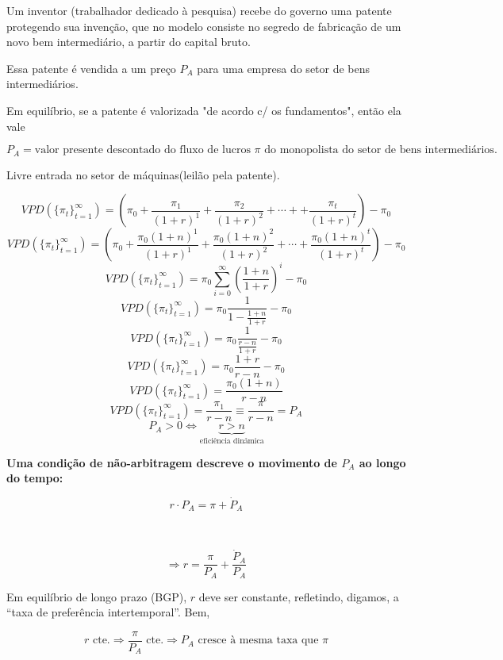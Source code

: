 \documentclass[a4paper,12pt]{article}[abntex2]
\begin{document}
Um inventor (trabalhador dedicado à pesquisa) recebe do governo uma patente protegendo sua invenção, que no modelo consiste no segredo de fabricação de um novo bem intermediário, a partir do capital bruto.

Essa patente é vendida a um preço $P_A$ para uma empresa do setor de bens intermediários.

Em equilíbrio, se a patente é valorizada "de acordo c/ os fundamentos", então ela vale

\[
P_A = \text{valor presente descontado do fluxo de lucros } \pi \text{ do monopolista do setor de bens intermediários}.
\] 

Livre entrada no setor de máquinas(leilão pela patente).

\[
VPD(\{\pi_t\}^\infty_{t=1})=\left(\pi_0+\frac{\pi_1}{(1+r)^1}+\frac{\pi_2}{(1+r)^2}+\cdots++\frac{\pi_t}{(1+r)^t}\right)-\pi_0
\]
\[
VPD(\{\pi_t\}^\infty_{t=1})=\left(\pi_0+\frac{\pi_0(1+n)^1}{(1+r)^1}+\frac{\pi_0(1+n)^2}{(1+r)^2}+\cdots +\frac{\pi_0(1+n)^t}{(1+r)^t}        \right)-\pi_0
\]
\[
VPD(\{\pi_t\}^\infty_{t=1})=\pi_0\sum_{i=0}^\infty\left(\frac{1+n}{1+r} \right)^i-\pi_0
\]
\[
VPD(\{\pi_t\}^\infty_{t=1})=\pi_0\frac{1}{1-\frac{1+n}{1+r}}-\pi_0
\]
\[
VPD(\{\pi_t\}^\infty_{t=1})=\pi_0\frac{1}{\frac{r-n}{1+r}}-\pi_0
\]
\[
VPD(\{\pi_t\}^\infty_{t=1})=\pi_0\frac{1+r}{r-n}-\pi_0
\]
\[
VPD(\{\pi_t\}^\infty_{t=1})=\frac{\pi_0(1+n)}{r-n}
\]
\[
VPD(\{\pi_t\}^\infty_{t=1})=\frac{\pi_1}{r-n} \equiv\frac{\pi}{r-n}=P_A
\]
\[
P_A>0\Leftrightarrow \underbrace{r>n}_\text{eficiência dinâmica}\]

\textbf{Uma condição de não-arbitragem descreve o movimento de $P_A$ ao longo do tempo:}

\[
r \cdot P_A = \pi + \dot{P}_A \tag{22}
\]

\begin{center}
 \\
\end{center}

\[
\Rightarrow r = \frac{\pi}{P_A} + \frac{\dot{P}_A}{P_A} \tag{23}
\]

Em equilíbrio de longo prazo (BGP), $r$ deve ser constante, refletindo, digamos, a ``taxa de preferência intertemporal''. Bem,

\[
r \text{ cte.} \Rightarrow \frac{\pi}{P_A} \text{ cte.} \Rightarrow P_A \text{ cresce à mesma taxa que } \pi
\]
\end{document}
